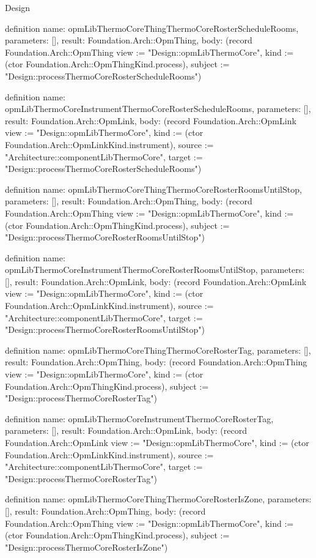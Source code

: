 \begin{lexlean}{Design}
\begin{semanticmodule}
definition{
  name: opmLibThermoCoreThingThermoCoreRosterScheduleRooms,
  parameters: [],
  result: Foundation.Arch::OpmThing,
  body: (record Foundation.Arch::OpmThing {view := "Design::opmLibThermoCore", kind := (ctor Foundation.Arch::OpmThingKind.process), subject := "Design::processThermoCoreRosterScheduleRooms"})
}

definition{
  name: opmLibThermoCoreInstrumentThermoCoreRosterScheduleRooms,
  parameters: [],
  result: Foundation.Arch::OpmLink,
  body: (record Foundation.Arch::OpmLink {view := "Design::opmLibThermoCore", kind := (ctor Foundation.Arch::OpmLinkKind.instrument), source := "Architecture::componentLibThermoCore", target := "Design::processThermoCoreRosterScheduleRooms"})
}

definition{
  name: opmLibThermoCoreThingThermoCoreRosterRoomsUntilStop,
  parameters: [],
  result: Foundation.Arch::OpmThing,
  body: (record Foundation.Arch::OpmThing {view := "Design::opmLibThermoCore", kind := (ctor Foundation.Arch::OpmThingKind.process), subject := "Design::processThermoCoreRosterRoomsUntilStop"})
}

definition{
  name: opmLibThermoCoreInstrumentThermoCoreRosterRoomsUntilStop,
  parameters: [],
  result: Foundation.Arch::OpmLink,
  body: (record Foundation.Arch::OpmLink {view := "Design::opmLibThermoCore", kind := (ctor Foundation.Arch::OpmLinkKind.instrument), source := "Architecture::componentLibThermoCore", target := "Design::processThermoCoreRosterRoomsUntilStop"})
}

definition{
  name: opmLibThermoCoreThingThermoCoreRosterTag,
  parameters: [],
  result: Foundation.Arch::OpmThing,
  body: (record Foundation.Arch::OpmThing {view := "Design::opmLibThermoCore", kind := (ctor Foundation.Arch::OpmThingKind.process), subject := "Design::processThermoCoreRosterTag"})
}

definition{
  name: opmLibThermoCoreInstrumentThermoCoreRosterTag,
  parameters: [],
  result: Foundation.Arch::OpmLink,
  body: (record Foundation.Arch::OpmLink {view := "Design::opmLibThermoCore", kind := (ctor Foundation.Arch::OpmLinkKind.instrument), source := "Architecture::componentLibThermoCore", target := "Design::processThermoCoreRosterTag"})
}

definition{
  name: opmLibThermoCoreThingThermoCoreRosterIsZone,
  parameters: [],
  result: Foundation.Arch::OpmThing,
  body: (record Foundation.Arch::OpmThing {view := "Design::opmLibThermoCore", kind := (ctor Foundation.Arch::OpmThingKind.process), subject := "Design::processThermoCoreRosterIsZone"})
}


\end{semanticmodule}
\end{lexlean}
